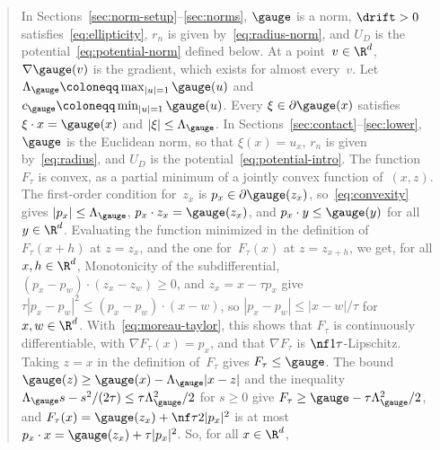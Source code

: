 \begin{quote}
In Sections~\ref{sec:norm-setup}--\ref{sec:norms}, $\gauge$ is a norm, $\drift>0$ satisfies~\eqref{eq:ellipticity}, $r_n$ is given by~\eqref{eq:radius-norm}, and $U_D$ is the potential~\eqref{eq:potential-norm} defined below. At a point~$v\in\R^d$, $\nabla\gauge(v)$ is the gradient, which exists for almost every~$v$. Let $\Lambda_\gauge\coloneqq\max_{|u|=1}\gauge(u)$ and $c_\gauge\coloneqq\min_{|u|=1}\gauge(u)$. Every $\xi\in\partial\gauge(x)$ satisfies $\xi\cdot x=\gauge(x)$ and $|\xi|\leq\Lambda_\gauge$. In Sections~\ref{sec:contact}--\ref{sec:lower}, $\gauge$ is the Euclidean norm, so that $\xi(x)=u_x$, $r_n$ is given by~\eqref{eq:radius}, and $U_D$ is the potential~\eqref{eq:potential-intro}.
The function~$F_\tau$ is convex, as a partial minimum of a jointly convex function of~$(x,z)$. The first-order condition for~$z_x$ is $p_x\in\partial \gauge(z_x)$, so~\eqref{eq:convexity} gives $|p_x|\leq\Lambda_\gauge$, $p_x\cdot z_x=\gauge(z_x)$, and $p_x\cdot y\leq \gauge(y)$ for all $y\in\R^d$. Evaluating the function minimized in the definition of~$F_\tau(x+h)$ at $z=z_x$, and the one for~$F_\tau(x)$ at $z=z_{x+h}$, we get, for all $x,h\in\R^d$,
Monotonicity of the subdifferential, $(p_x-p_w)\cdot(z_x-z_w)\geq0$, and $z_x=x-\tau p_x$ give $\tau|p_x-p_w|^2\leq(p_x-p_w)\cdot(x-w)$, so $|p_x-p_w|\leq|x-w|/\tau$ for $x,w\in\R^d$. With~\eqref{eq:moreau-taylor}, this shows that $F_\tau$ is continuously differentiable, with $\nabla F_\tau(x)=p_x$, and that $\nabla F_\tau$ is $\nf1\tau$-Lipschitz. Taking $z=x$ in the definition of~$F_\tau$ gives $F_\tau\leq \gauge$. The bound $\gauge(z)\geq \gauge(x)-\Lambda_\gauge|x-z|$ and the inequality $\Lambda_\gauge s-s^2/(2\tau)\leq\tau\Lambda_\gauge^2/2$ for $s\geq0$ give $F_\tau\geq \gauge-\tau\Lambda_\gauge^2/2$, and $F_\tau(x)=\gauge(z_x)+\nf\tau2|p_x|^2$ is at most $p_x\cdot x=\gauge(z_x)+\tau|p_x|^2$. So, for all $x\in\R^d$,
\end{quote}
